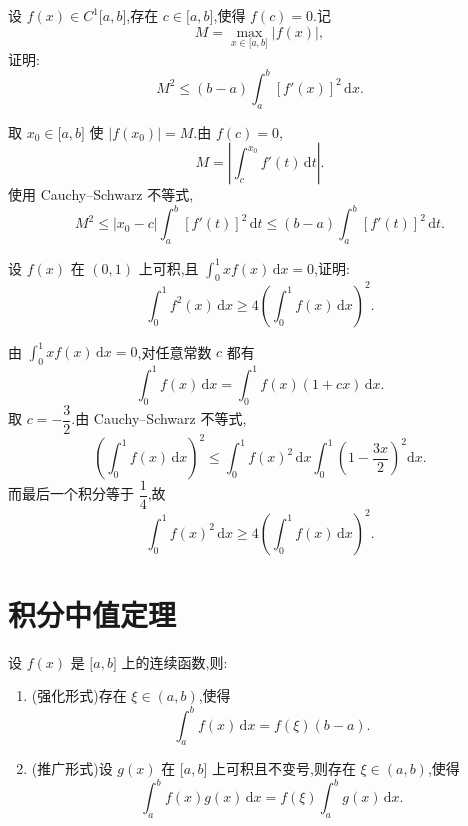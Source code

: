 \begin{example}
    设 $f(x)\in C^1\lbrack a,b\rbrack$,存在 $c\in\lbrack a,b\rbrack$,使得 $f(c)=0$.记
    \[
        M=\max\limits_{x\in\lbrack a,b\rbrack}|f(x)|,
    \]
    证明:
    \[
        M^2\leq(b-a)\int_a^b[f'(x)]^2\,\mathrm{d}x.
    \]
\end{example}
\exampleblank

\begin{solution}
    取 $x_0\in\lbrack a,b\rbrack$ 使 $|f(x_0)|=M$.由 $f(c)=0$,
    \[
        M=\left|\int_c^{x_0}f'(t)\,\mathrm{d}t\right|.
    \]
    使用 Cauchy--Schwarz 不等式,
    \[
        M^2
        \leq|x_0-c|\int_a^b[f'(t)]^2\,\mathrm{d}t
        \leq(b-a)\int_a^b[f'(t)]^2\,\mathrm{d}t.
    \]
\end{solution}

\begin{example}
    设 $f(x)$ 在 $(0,1)$ 上可积,且 $\displaystyle\int_0^1xf(x)\,\mathrm{d}x=0$,证明:
    \[
        \displaystyle\int_0^1f^2(x)\,\mathrm{d}x
        \geq4\left(\int_0^1f(x)\,\mathrm{d}x\right)^2.
    \]
\end{example}
\exampleblank

\begin{solution}
    由 $\displaystyle\int_0^1xf(x)\,\mathrm{d}x=0$,对任意常数 $c$ 都有
    \[
        \displaystyle\int_0^1f(x)\,\mathrm{d}x
        =\int_0^1f(x)(1+cx)\,\mathrm{d}x.
    \]
    取 $c=-\dfrac{3}{2}$.由 Cauchy--Schwarz 不等式,
    \[
        \left(\int_0^1f(x)\,\mathrm{d}x\right)^2
        \leq\int_0^1f(x)^2\,\mathrm{d}x
        \int_0^1\left(1-\dfrac{3x}{2}\right)^2\mathrm{d}x.
    \]
    而最后一个积分等于 $\dfrac{1}{4}$,故
    \[
        \displaystyle\int_0^1f(x)^2\,\mathrm{d}x
        \geq4\left(\int_0^1f(x)\,\mathrm{d}x\right)^2.
    \]
\end{solution}


\newpage

\section{积分中值定理}

\begin{theorem}
    设 $f(x)$ 是 $\lbrack a,b\rbrack$ 上的连续函数,则:
    \begin{enumerate}
        \item (强化形式)存在 $\xi\in(a,b)$,使得
              \[
                  \displaystyle\int_a^bf(x)\,\mathrm{d}x=f(\xi)(b-a).
              \]
        \item (推广形式)设 $g(x)$ 在 $\lbrack a,b\rbrack$ 上可积且不变号,则存在 $\xi\in(a,b)$,使得
              \[
                  \displaystyle\int_a^bf(x)g(x)\,\mathrm{d}x
                  =f(\xi)\int_a^bg(x)\,\mathrm{d}x.
              \]
    \end{enumerate}
\end{theorem}

